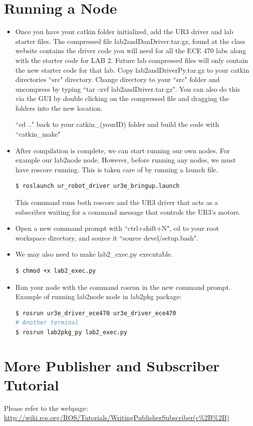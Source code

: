 \section{Running a Node}
\begin{itemize}
\item Once you have your catkin folder initialized, add the UR3 driver and lab starter files.  The compressed file lab2andDanDriver.tar.gz, found
at the class website contains the driver code you will need for all the ECE 470 labs along with the starter code for LAB 2.  Future lab compressed 
files will only contain the new starter code for that lab.  Copy lab2andDriverPy.tar.gz to your catkin directories ``src" directory.  Change directory
to your ``src" folder and uncompress by typing ``tar -xvf lab2andDriver.tar.gz".  You can also do this via the GUI by double clicking on the compressed file and dragging the folders into the new location.

``cd .." back to your catkin\_(yourID) folder and build the code
with ``catkin\_make"
\item After compilation is complete, we can start running our own nodes. For example our lab2node node. However, before running any nodes, we must
have roscore running. This is taken care of by running a launch file.

\begin{lstlisting}[language=bash]
$ roslaunch ur_robot_driver ur3e_bringup.launch
\end{lstlisting}

This command runs both roscore and the UR3 driver that acts as a subscriber waiting for a command message that controls the UR3's motors.


\item Open a new command prompt with ``ctrl+shift+N", cd to your root workspace directory, and source it ``source devel/setup.bash".

\item We may also need to make lab2\_exec.py executable.
\begin{lstlisting}[language=bash]
$ chmod +x lab2_exec.py
\end{lstlisting}

\item Run your node with the command rosrun in the new command prompt. Example of running lab2node node in lab2pkg package: 
\begin{lstlisting}[language=bash]
$ rosrun ur3e_driver_ece470 ur3e_driver_ece470
# Another terminal
$ rosrun lab2pkg_py lab2_exec.py
\end{lstlisting}
\end{itemize}


\section{More Publisher and Subscriber Tutorial}
Please refer to the webpage: \url{http://wiki.ros.org/ROS/Tutorials/WritingPublisherSubscriber(c\%2B\%2B)}


